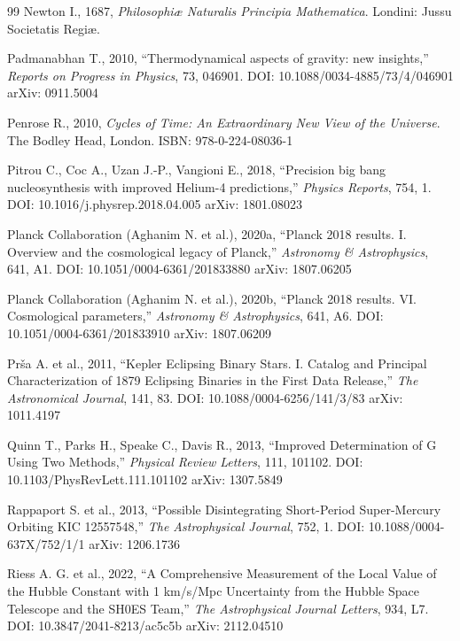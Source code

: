 \documentclass[11pt,a4paper]{article}
\begin{document}
{\begin{thebibliography}{99}
Newton I., 1687, \emph{Philosophiæ Naturalis Principia Mathematica}. Londini: Jussu Societatis Regiæ.

Padmanabhan T., 2010, ``Thermodynamical aspects of gravity: new insights,'' \emph{Reports on Progress in Physics}, 73, 046901. DOI: 10.1088/0034-4885/73/4/046901 arXiv: 0911.5004

Penrose R., 2010, \emph{Cycles of Time: An Extraordinary New View of the Universe}. The Bodley Head, London. ISBN: 978-0-224-08036-1

Pitrou C., Coc A., Uzan J.-P., Vangioni E., 2018, ``Precision big bang nucleosynthesis with improved Helium-4 predictions,'' \emph{Physics Reports}, 754, 1. DOI: 10.1016/j.physrep.2018.04.005 arXiv: 1801.08023

Planck Collaboration (Aghanim N. et al.), 2020a, ``Planck 2018 results. I. Overview and the cosmological legacy of Planck,'' \emph{Astronomy \& Astrophysics}, 641, A1. DOI: 10.1051/0004-6361/201833880 arXiv: 1807.06205

Planck Collaboration (Aghanim N. et al.), 2020b, ``Planck 2018 results. VI. Cosmological parameters,'' \emph{Astronomy \& Astrophysics}, 641, A6. DOI: 10.1051/0004-6361/201833910 arXiv: 1807.06209

Prša A. et al., 2011, ``Kepler Eclipsing Binary Stars. I. Catalog and Principal Characterization of 1879 Eclipsing Binaries in the First Data Release,'' \emph{The Astronomical Journal}, 141, 83. DOI: 10.1088/0004-6256/141/3/83 arXiv: 1011.4197

Quinn T., Parks H., Speake C., Davis R., 2013, ``Improved Determination of G Using Two Methods,'' \emph{Physical Review Letters}, 111, 101102. DOI: 10.1103/PhysRevLett.111.101102 arXiv: 1307.5849

Rappaport S. et al., 2013, ``Possible Disintegrating Short-Period Super-Mercury Orbiting KIC 12557548,'' \emph{The Astrophysical Journal}, 752, 1. DOI: 10.1088/0004-637X/752/1/1 arXiv: 1206.1736

Riess A. G. et al., 2022, ``A Comprehensive Measurement of the Local Value of the Hubble Constant with 1 km/s/Mpc Uncertainty from the Hubble Space Telescope and the SH0ES Team,'' \emph{The Astrophysical Journal Letters}, 934, L7. DOI: 10.3847/2041-8213/ac5c5b arXiv: 2112.04510


\end{thebibliography}}
\end{document}
